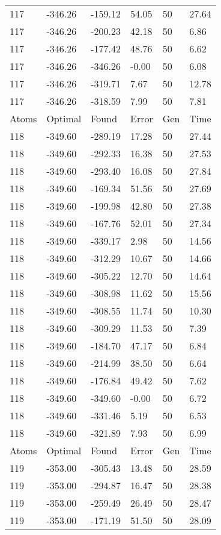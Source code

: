 \documentclass{report}
\begin{document}
\begin{appendix}
\begin{longtable}{llllll}
117 & -346.26 & -159.12 & 54.05 & 50 & 27.64 \\
117 & -346.26 & -200.23 & 42.18 & 50 & 6.86 \\
117 & -346.26 & -177.42 & 48.76 & 50 & 6.62 \\
117 & -346.26 & -346.26 & -0.00 & 50 & 6.08 \\
117 & -346.26 & -319.71 & 7.67 & 50 & 12.78 \\
117 & -346.26 & -318.59 & 7.99 & 50 & 7.81 \\
Atoms & Optimal & Found & Error & Gen & Time \\
118 & -349.60 & -289.19 & 17.28 & 50 & 27.44 \\
118 & -349.60 & -292.33 & 16.38 & 50 & 27.53 \\
118 & -349.60 & -293.40 & 16.08 & 50 & 27.84 \\
118 & -349.60 & -169.34 & 51.56 & 50 & 27.69 \\
118 & -349.60 & -199.98 & 42.80 & 50 & 27.38 \\
118 & -349.60 & -167.76 & 52.01 & 50 & 27.34 \\
118 & -349.60 & -339.17 & 2.98 & 50 & 14.56 \\
118 & -349.60 & -312.29 & 10.67 & 50 & 14.66 \\
118 & -349.60 & -305.22 & 12.70 & 50 & 14.64 \\
118 & -349.60 & -308.98 & 11.62 & 50 & 15.56 \\
118 & -349.60 & -308.55 & 11.74 & 50 & 10.30 \\
118 & -349.60 & -309.29 & 11.53 & 50 & 7.39 \\
118 & -349.60 & -184.70 & 47.17 & 50 & 6.84 \\
118 & -349.60 & -214.99 & 38.50 & 50 & 6.64 \\
118 & -349.60 & -176.84 & 49.42 & 50 & 7.62 \\
118 & -349.60 & -349.60 & -0.00 & 50 & 6.72 \\
118 & -349.60 & -331.46 & 5.19 & 50 & 6.53 \\
118 & -349.60 & -321.89 & 7.93 & 50 & 6.99 \\
Atoms & Optimal & Found & Error & Gen & Time \\
119 & -353.00 & -305.43 & 13.48 & 50 & 28.59 \\
119 & -353.00 & -294.87 & 16.47 & 50 & 28.38 \\
119 & -353.00 & -259.49 & 26.49 & 50 & 28.47 \\
119 & -353.00 & -171.19 & 51.50 & 50 & 28.09 \\

\end{longtable}
\end{appendix}
\end{document}
